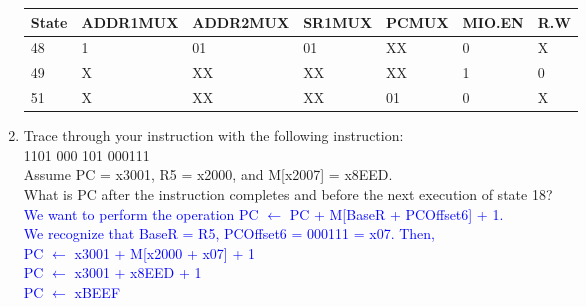 \documentclass{article}
\begin{document}
\begin{enumerate}[label=(\alph*),itemsep = 20pt]
\begin{table}[!h]
\begin{tabular}{|l|l|l|l|l|l|l|}
\hline
\textbf{State} & \textbf{ADDR1MUX} & \textbf{ADDR2MUX} & \textbf{SR1MUX} & \textbf{PCMUX} & \textbf{MIO.EN} & \textbf{R.W} \\ \hline
48             & 1                 & 01                & 01              & XX             & 0               & X            \\ \hline
49             & X                 & XX                & XX              & XX             & 1               & 0            \\ \hline
51             & X                 & XX                & XX              & 01             & 0               & X            \\ \hline
\end{tabular}
\end{table}
        
        \item Trace through your instruction with the following instruction: \\
        1101 000 101 000111 \\
        Assume PC = x3001, R5 = x2000, and M[x2007] = x8EED. \\
        What is PC after the instruction completes and before the next execution of state 18?\\
        \textcolor{blue}{
        We want to perform the operation PC $\longleftarrow$ PC + M[BaseR + PCOffset6] + 1. \\ We recognize that BaseR = R5, PCOffset6 = 000111 = x07. Then, \\
        PC $\longleftarrow$ x3001 + M[x2000 + x07] + 1 \\
        PC $\longleftarrow$ x3001 + x8EED + 1 \\
        PC $\longleftarrow$ xBEEF \\
        }
        
    \end{enumerate}

    \newpage
\end{document}

